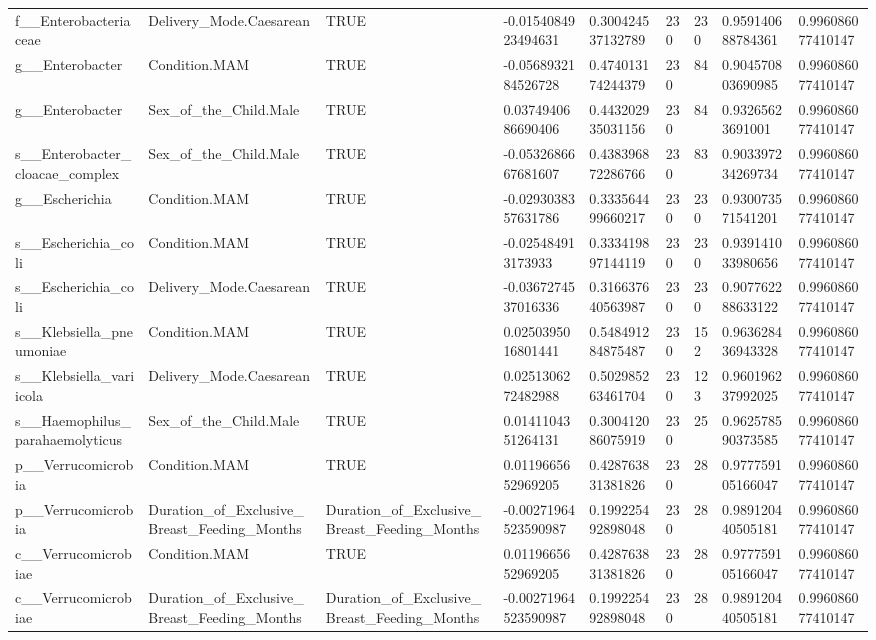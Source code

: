 \begin{longtable}{lllllllll}
f\_\_Enterobacteriaceae & Delivery\_Mode.Caesarean & TRUE & -0.0154084923494631 & 0.300424537132789 & 230 & 230 & 0.959140688784361 & 0.996086077410147 \\
g\_\_Enterobacter & Condition.MAM & TRUE & -0.0568932184526728 & 0.474013174244379 & 230 & 84 & 0.904570803690985 & 0.996086077410147 \\
g\_\_Enterobacter & Sex\_of\_the\_Child.Male & TRUE & 0.0374940686690406 & 0.443202935031156 & 230 & 84 & 0.93265623691001 & 0.996086077410147 \\
s\_\_Enterobacter\_cloacae\_complex & Sex\_of\_the\_Child.Male & TRUE & -0.0532686667681607 & 0.438396872286766 & 230 & 83 & 0.903397234269734 & 0.996086077410147 \\
g\_\_Escherichia & Condition.MAM & TRUE & -0.0293038357631786 & 0.333564499660217 & 230 & 230 & 0.930073571541201 & 0.996086077410147 \\
s\_\_Escherichia\_coli & Condition.MAM & TRUE & -0.025484913173933 & 0.333419897144119 & 230 & 230 & 0.939141033980656 & 0.996086077410147 \\
s\_\_Escherichia\_coli & Delivery\_Mode.Caesarean & TRUE & -0.0367274537016336 & 0.316637640563987 & 230 & 230 & 0.907762288633122 & 0.996086077410147 \\
s\_\_Klebsiella\_pneumoniae & Condition.MAM & TRUE & 0.0250395016801441 & 0.548491284875487 & 230 & 152 & 0.963628436943328 & 0.996086077410147 \\
s\_\_Klebsiella\_variicola & Delivery\_Mode.Caesarean & TRUE & 0.0251306272482988 & 0.502985263461704 & 230 & 123 & 0.960196237992025 & 0.996086077410147 \\
s\_\_Haemophilus\_parahaemolyticus & Sex\_of\_the\_Child.Male & TRUE & 0.0141104351264131 & 0.300412086075919 & 230 & 25 & 0.962578590373585 & 0.996086077410147 \\
p\_\_Verrucomicrobia & Condition.MAM & TRUE & 0.0119665652969205 & 0.428763831381826 & 230 & 28 & 0.977759105166047 & 0.996086077410147 \\
p\_\_Verrucomicrobia & Duration\_of\_Exclusive\_Breast\_Feeding\_Months & Duration\_of\_Exclusive\_Breast\_Feeding\_Months & -0.00271964523590987 & 0.199225492898048 & 230 & 28 & 0.989120440505181 & 0.996086077410147 \\
c\_\_Verrucomicrobiae & Condition.MAM & TRUE & 0.0119665652969205 & 0.428763831381826 & 230 & 28 & 0.977759105166047 & 0.996086077410147 \\
c\_\_Verrucomicrobiae & Duration\_of\_Exclusive\_Breast\_Feeding\_Months & Duration\_of\_Exclusive\_Breast\_Feeding\_Months & -0.00271964523590987 & 0.199225492898048 & 230 & 28 & 0.989120440505181 & 0.996086077410147 \\

\end{longtable}
